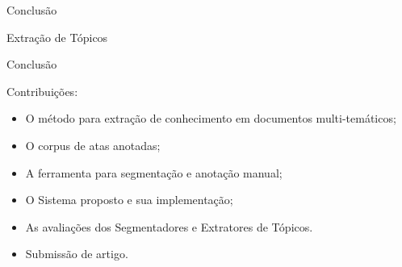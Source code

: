 \documentclass[xcolor=table]{beamer}
\begin{document}
\begin{frame}{Conclusão}

	\center Extração de Tópicos



\end{frame}



\begin{frame}{Conclusão}

	\nblock{} {
Contribuições:

	\begin{itemize}
\item O método para extração de conhecimento em documentos multi-temáticos; 
\item O corpus de atas anotadas;
\item A ferramenta para segmentação e anotação manual;
\item O Sistema proposto e sua implementação; 
\item As avaliações dos Segmentadores e Extratores de Tópicos.

	\end{itemize}
	}

	\eblock{} {
		\begin{itemize}
			\item Submissão de artigo.
		\end{itemize}
	}

\end{frame}
\end{document}
